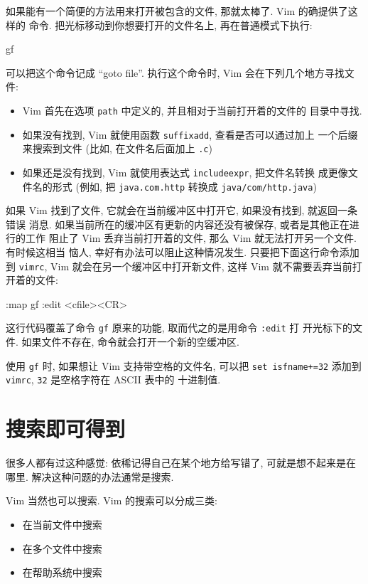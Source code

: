 如果能有一个简便的方法用来打开被包含的文件, 那就太棒了. Vim 的确提供了这样的
命令. 把光标移动到你想要打开的文件名上, 再在普通模式下执行:
\begin{vimcode}
gf
\end{vimcode}
可以把这个命令记成 ``goto file''. 执行这个命令时, Vim 会在下列几个地方寻找文件:
\begin{itemize}
    \item Vim 首先在选项 \texttt{path} 中定义的, 并且相对于当前打开着的文件的
        目录中寻找.
    \item 如果没有找到, Vim 就使用函数 \texttt{suffixadd}, 查看是否可以通过加上
        一个后缀来搜索到文件 (比如, 在文件名后面加上 \texttt{.c})
    \item 如果还是没有找到, Vim 就使用表达式 \texttt{includeexpr}, 把文件名转换
        成更像文件名的形式 (例如, 把 \texttt{java.com.http} 转换成
        \texttt{java/com/http.java})
\end{itemize}

如果 Vim 找到了文件, 它就会在当前缓冲区中打开它, 如果没有找到, 就返回一条错误
消息. 如果当前所在的缓冲区有更新的内容还没有被保存, 或者是其他正在进行的工作
阻止了 Vim 丢弃当前打开着的文件, 那么 Vim 就无法打开另一个文件. 有时候这相当
恼人, 幸好有办法可以阻止这种情况发生. 只要把下面这行命令添加到 \texttt{vimrc},
Vim 就会在另一个缓冲区中打开新文件, 这样 Vim 就不需要丢弃当前打开着的文件:
\begin{vimcode}
:map gf :edit <cfile><CR>
\end{vimcode}
这行代码覆盖了命令 \texttt{gf} 原来的功能, 取而代之的是用命令 \texttt{:edit} 打
开光标下的文件. 如果文件不存在, 命令就会打开一个新的空缓冲区.

\begin{warning}
    使用 \texttt{gf} 时, 如果想让 Vim 支持带空格的文件名, 可以把 \texttt{set
    isfname+=32} 添加到 \texttt{vimrc}, \texttt{32} 是空格字符在 ASCII 表中的
    十进制值.
\end{warning}

\section{搜索即可得到}
\label{sec:search_and_you_will_find}

很多人都有过这种感觉: 依稀记得自己在某个地方给写错了, 可就是想不起来是在哪里.
解决这种问题的办法通常是搜索.

Vim 当然也可以搜索. Vim 的搜索可以分成三类:
\begin{itemize}
    \item 在当前文件中搜索
    \item 在多个文件中搜索
    \item 在帮助系统中搜索
\end{itemize}

